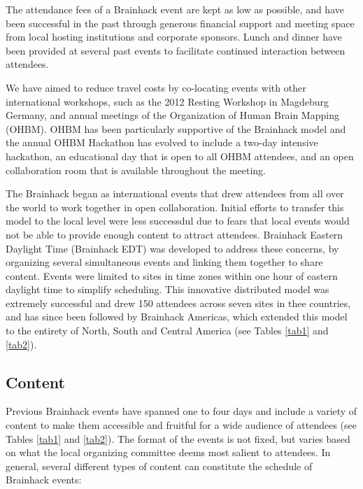 \documentclass[11pt]{bmc_article_s50}
\begin{document}
The attendance fees of a Brainhack event are kept as low as possible, and have been successful in the past through generous financial support and meeting space from local hosting institutions and corporate sponsors. Lunch and dinner have been provided at several past events to facilitate continued interaction between attendees. 

We have aimed to reduce travel costs by co-locating events with other international workshops, such as the 2012 Resting Workshop in Magdeburg Germany, and annual meetings of the Organization of Human Brain Mapping (OHBM). OHBM has been particularly supportive of the Brainhack model and the annual OHBM Hackathon has evolved to include a two-day intensive hackathon, an educational day that is open to all OHBM attendees, and an open collaboration room that is available throughout the meeting.

The Brainhack began as international events that drew attendees from all over the world to work together in open collaboration. Initial efforts to transfer this model to the local level were less successdul due to fears that local events would not be able to provide enough content to attract attendees. Brainhack Eastern Daylight Time (Brainhack EDT) was developed to address these concerns, by organizing several simultaneous events and linking them together to share content. Events were limited to sites in time zones within one hour of eastern daylight time to simplify scheduling. This innovative distributed model was extremely successful and drew 150 attendees across seven sites in thee countries, and has since been followed by Brainhack Americas, which extended this model to the entirety of North, South and Central America (see Tables \ref{tab1} and \ref{tab2}).


\subsection{Content}

Previous Brainhack events have spanned one to four days and include a variety of content to make them accessible and fruitful for a wide audience of attendees (see Tables \ref{tab1} and \ref{tab2}). The format of the events is not fixed, but varies based on what the local organizing committee deems most salient to attendees. In general, several different types of content can constitute the schedule of Brainhack events:
\end{document}
